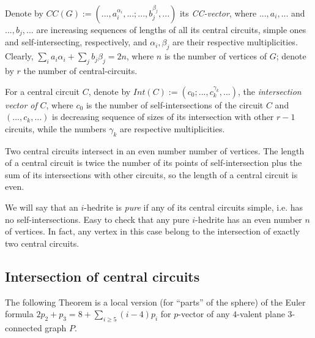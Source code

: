 \documentclass[12pt]{article}
\begin{document}


Denote by 
$CC(G):=(...,a_i^{\alpha_i},...;...,b_j^{\beta_j},...)$ its {\it CC-vector}, 
where $...,a_i,...$ and  $...,b_j,...$ are increasing sequences of lengths of 
all its central circuits, simple ones and self-intersecting, respectively, 
and $\alpha_i, \beta_j$ are their respective multiplicities.
Clearly, $\sum_{i} a_i{\alpha_i}+ \sum_{j} b_j{\beta_j}=2n$, where 
$n$ is the number of vertices of $G$; denote by $r$ the number of 
central-circuits.


For a central circuit $C$, denote by $Int(C):=(c_0;...,c_k^{\gamma_k},...)$,
the {\em intersection vector of} $C$, where $c_0$ is
the number of self-intersections of the circuit $C$ and $(...,c_k,...)$ is
decreasing sequence of sizes of its intersection with other $r-1$ 
circuits, while the numbers $\gamma_k$ are respective multiplicities.


Two central circuits intersect in an even number number of vertices. 
The length of a central circuit is twice the number of its points of 
self-intersection plus the sum of its intersections with other circuits, 
so the length of a central circuit is even.



We will say that an $i$-hedrite is {\it pure} if any of its central circuits 
simple, i.e. has no self-intersections.
Easy to check that any pure $i$-hedrite has an even number $n$ of 
vertices. In fact, any vertex in this case belong to the intersection 
of exactly two central circuits.




\subsection{Intersection of central circuits}

The following Theorem is a local version (for ``parts'' of the sphere) of
the Euler formula
$2p_2+p_3=8+ \sum_{i\geq 5} (i-4)p_i$ for $p$-vector of any $4$-valent 
plane $3$-connected graph $P$.
\end{document}
